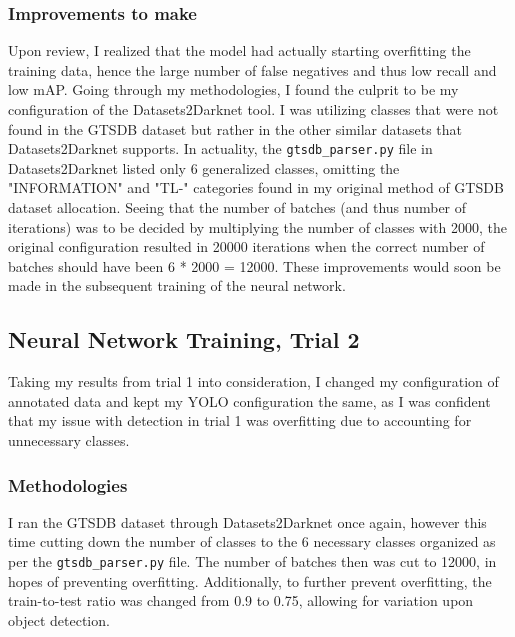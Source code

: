 \documentclass{article}
\begin{document}
            \pagebreak
            \subsubsection{Improvements to make}
            
            Upon review, I realized that the model had actually starting overfitting the training data, hence the large number of false negatives and thus low recall and low mAP. Going through my methodologies, I found the culprit to be my configuration of the Datasets2Darknet tool. I was utilizing classes that were not found in the GTSDB dataset but rather in the other similar datasets that Datasets2Darknet supports. In actuality, the \texttt{gtsdb\_parser.py} file in Datasets2Darknet listed only 6 generalized classes, omitting the "INFORMATION" and "TL-" categories found in my original method of GTSDB dataset allocation. Seeing that the number of batches (and thus number of iterations) was to be decided by multiplying the number of classes with 2000, the original configuration resulted in 20000 iterations when the correct number of batches should have been 6 * 2000 = 12000. These improvements would soon be made in the subsequent training of the neural network.
        
        \subsection{Neural Network Training, Trial 2}
        
            Taking my results from trial 1 into consideration, I changed my configuration of annotated data and kept my YOLO configuration the same, as I was confident that my issue with detection in trial 1 was overfitting due to accounting for unnecessary classes. 
        
            \subsubsection{Methodologies}
            
            I ran the GTSDB dataset through Datasets2Darknet once again, however this time cutting down the number of classes to the 6 necessary classes organized as per the \texttt{gtsdb\_parser.py} file. The number of batches then was cut to 12000, in hopes of preventing overfitting. Additionally, to further prevent overfitting, the train-to-test ratio was changed from 0.9 to 0.75, allowing for variation upon object detection. 
            
\end{document}

